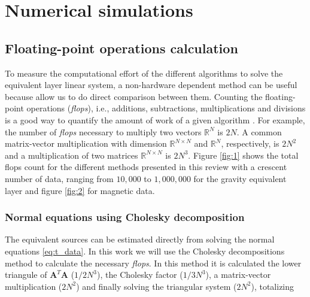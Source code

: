 \section{Numerical simulations}
\label{sec:num_simulations}

 
\subsection{Floating-point operations calculation}

To measure the computational effort of the different algorithms to solve the equivalent layer linear system, a non-hardware dependent method can be useful because allow us to do direct comparison between them. Counting the floating-point operations (\textit{flops}), i.e., additions, subtractions, multiplications and divisions is a good way to quantify the amount of work of a given algorithm \citep{golub-vanloan2013}. For example, the number of \textit{flops} necessary to multiply two vectors $\mathbb{R}^{N}$ is $2N$. A common matrix-vector multiplication with dimension $\mathbb{R}^{N \times N}$ and $\mathbb{R}^{N}$, respectively, is $2N^2$ and a multiplication of two matrices $\mathbb{R}^{N \times N}$ is $2N^3$. Figure \ref{fig:1} shows the total flops count for the different methods presented in this review with a crescent number of data, ranging from $10,000$ to $1,000,000$ for the gravity equivalent layer and figure \ref{fig:2} for magnetic data. 

\subsubsection{Normal equations using Cholesky decomposition}

The equivalent sources can be estimated directly from solving the normal equations \ref{eq:t_data}. In this work we will use the Cholesky decompositions method to calculate the necessary \textit{flops}. In this method it is calculated the lower triangule of $\mathbf{A}^T\mathbf{A}$ ($1/2 N^3$), the Cholesky factor ($1/3 N^3$), a matrix-vector multiplication ($2N^2$) and finally solving the triangular system ($2N^2$), totalizing

